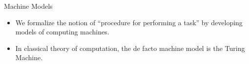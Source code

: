 \documentclass[c]{beamer}
\begin{document}




  




\begin{frame}{Machine Models}
  
  \begin{itemize}
  \item We formalize the notion of ``procedure for performing a task''
    by developing models of computing machines.
  \item In classical theory of computation, the de facto machine model
    is the Turing Machine.\pause
  \end{itemize}

\end{frame}
\end{document}
